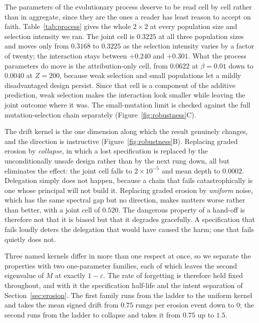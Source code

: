 \documentclass[11pt,a4paper]{article}
\theoremstyle{definition}
\begin{document}
The parameters of the evolutionary process deserve to be read cell by cell
rather than in aggregate, since they are the ones a reader has least reason to
accept on faith. Table~\ref{tab:process} gives the whole $2\times2$ at every
population size and selection intensity we ran. The joint cell is $0.3225$ at
all three population sizes and moves only from $0.3168$ to $0.3225$ as the
selection intensity varies by a factor of twenty; the interaction stays between
$+0.240$ and $+0.301$. What the process parameters do move is the
attribution-only cell, from $0.0622$ at $\beta=0.01$ down to $0.0040$ at
$Z=200$, because weak selection and small populations let a mildly disadvantaged
design persist. Since that cell is a component of the additive prediction, weak
selection makes the interaction look smaller while leaving the joint outcome
where it was. The small-mutation limit is checked against the full
mutation-selection chain separately (Figure~\ref{fig:robustness}C).



The drift kernel is the one dimension along which the result genuinely changes,
and the direction is instructive (Figure~\ref{fig:robustness}B). Replacing
graded erosion by \emph{collapse}, in which a lost specification is replaced by
the unconditionally unsafe design rather than by the next rung down, all but
eliminates the effect: the joint cell falls to $2\times10^{-5}$ and mean depth
to $0.0002$. Delegation simply does not happen, because a chain that fails
catastrophically is one whose principal will not build it. Replacing graded
erosion by \emph{uniform} noise, which has the same spectral gap but no
direction, makes matters worse rather than better, with a joint cell of $0.520$.
The dangerous property of a hand-off is therefore not that it is biased but
that it degrades gracefully. A specification that fails loudly deters the
delegation that would have caused the harm; one that fails quietly does not.

Three named kernels differ in more than one respect at once, so we separate the
properties with two one-parameter families, each of which leaves the second
eigenvalue of $M$ at exactly $1-\varepsilon$. The rate of forgetting is
therefore held fixed throughout, and with it the specification half-life and
the intent separation of Section~\ref{sec:erosion}. The first family runs from
the ladder to the uniform kernel and takes the mean signed drift from $0.75$
rungs per erosion event down to $0$; the second runs from the ladder to
collapse and takes it from $0.75$ up to $1.5$.
\end{document}
